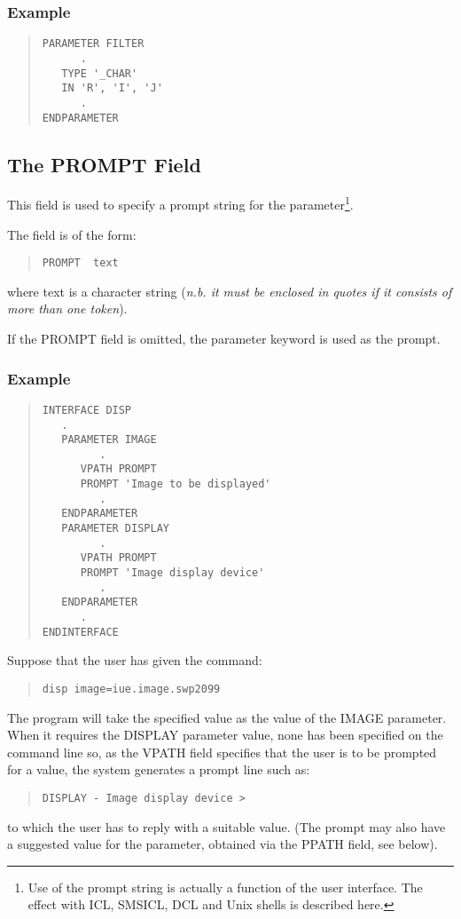 \subsubsection*{Example}
\begin{quote} \begin{verbatim}
PARAMETER FILTER
      .
   TYPE '_CHAR'
   IN 'R', 'I', 'J'
      .
ENDPARAMETER
\end{verbatim} \end{quote}

\subsection{The PROMPT Field}
This field is used to specify a prompt string for the parameter\footnote{Use
of the prompt string is actually a function of the user interface.
The effect with ICL, SMSICL, DCL and Unix shells is described here.}.

The field is of the form:
\begin{quote} \begin{verbatim}
PROMPT  text
\end{verbatim} \end{quote}
where text is a character string ({\em n.b. it must be enclosed in quotes
if it consists of more than one token}\/).

If the PROMPT field is omitted, the parameter keyword is used as the prompt.

\subsubsection*{Example}
\begin{quote} \begin{verbatim}
INTERFACE DISP
   .
   PARAMETER IMAGE
         .
      VPATH PROMPT
      PROMPT 'Image to be displayed'
         .
   ENDPARAMETER
   PARAMETER DISPLAY
         .
      VPATH PROMPT
      PROMPT 'Image display device'
         .
   ENDPARAMETER
      .
ENDINTERFACE
\end{verbatim} \end{quote}
Suppose that the user has given the command:
\begin{quote} \begin{verbatim}
disp image=iue.image.swp2099
\end{verbatim} \end{quote}
The program will take the specified value as the value of the IMAGE parameter.
When it requires the DISPLAY parameter value, none has been specified on
the command line so, as the VPATH field specifies that the user is
to be prompted for a value, the system generates a prompt line such 
as:
\begin{quote} \begin{verbatim}
DISPLAY - Image display device >
\end{verbatim} \end{quote}
to which the user has to reply with a suitable value. (The prompt may
also have a suggested value for the parameter, obtained via the PPATH
field, see below).

